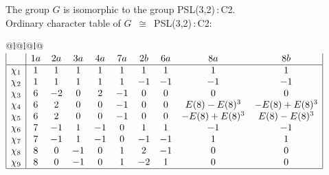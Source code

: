 \documentclass[varwidth=\maxdimen,border=10]{standalone}
\begin{document}
The group $G$ is isomorphic to the group PSL(3,2)\,:\,C2.\\
Ordinary character table of $G$\ $\cong$\ PSL(3,2)\,:\,C2:\\
\begin{center}
\begin{tabular}{@{}l@{}l@{}l@{}}
\hline
\(\begin{array}{|l|ccccccccc|}
  & 1a & 2a & 3a & 4a & 7a & 2b & 6a & 8a & 8b\\ \hline
\chi_{1} & 1 & 1 & 1 & 1 & 1 & 1 & 1 & 1 & 1\\
\chi_{2} & 1 & 1 & 1 & 1 & 1 & -1 & -1 & -1 & -1\\
\chi_{3} & 6 & -2 & 0 & 2 & -1 & 0 & 0 & 0 & 0\\
\chi_{4} & 6 & 2 & 0 & 0 & -1 & 0 & 0 & E(8)-E(8)^{3} & -E(8)+E(8)^{3}\\
\chi_{5} & 6 & 2 & 0 & 0 & -1 & 0 & 0 & -E(8)+E(8)^{3} & E(8)-E(8)^{3}\\
\chi_{6} & 7 & -1 & 1 & -1 & 0 & 1 & 1 & -1 & -1\\
\chi_{7} & 7 & -1 & 1 & -1 & 0 & -1 & -1 & 1 & 1\\
\chi_{8} & 8 & 0 & -1 & 0 & 1 & 2 & -1 & 0 & 0\\
\chi_{9} & 8 & 0 & -1 & 0 & 1 & -2 & 1 & 0 & 0\\
\hline
\end{array}\)\\
\end{tabular}
\end{center}
\end{document}
